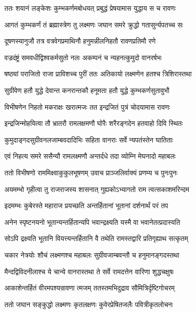 \twolineshloka
{ततः शयानं लङ्केशः कुम्भकर्णमबोधयत्}
{प्रबुद्धं प्रेषयामास युद्धाय स च रावणः}%

\twolineshloka
{आगतं कुम्भकर्णं तं ब्रह्मास्त्रेण तु लक्ष्मणः}
{जघान समरे क्रुद्धो गतासुर्न्यपतच्च सः}%

\twolineshloka
{दूषणस्यानुजौ तत्र वत्रवेगप्रमाथिनौ}
{हनुमन्नीलनिहतौ रावणप्रतिमौ रणे}%

\twolineshloka
{वज्रदंष्ट्रं समवधीद्विश्वकर्मसुतो नलः}
{अकम्पनं च न्यहनत्कुमुदो वानरर्षभः}%

\twolineshloka
{षष्ठ्यां पराजितो राजा प्राविशच्च पुरीं ततः}
{अतिकायो लक्ष्मणेन हतश्च त्रिशिरास्तथा}%

\twolineshloka
{सुग्रीवेण हतौ युद्धे देवान्त कनरान्तकौ}
{हनूमता हतौ युद्धे कुम्भकर्णसुतावुभौ}%

\twolineshloka
{विभीषणेन निहतो मकराक्षः खरात्मजः}
{तत इन्द्रजितं पुत्रं चोदयामास रावणः}%

\twolineshloka
{इन्द्रजिन्मोहयित्वा तौ भ्रातरौ रामलक्षमणौ}
{घोरैः शरैरङ्गदेन हतवाहो दिवि स्थितः}%

\twolineshloka
{कुमुदाङ्गदसुग्रीवनलजाम्बवदादिभिः}
{सहिता वानराः सर्वे न्यपतंस्तेन घातिताः}%

\twolineshloka
{एवं निहत्य समरे ससैन्यौ रामलक्ष्मणौ}
{अन्तर्दधे तदा व्योम्नि मेघनादो महाबलः}%

\twolineshloka
{ततो विभीषणो राममिक्ष्वाकुकुलभूषणम्}
{उवाच प्राञ्जलिर्वाक्यं प्रणम्य च पुनःपुनः}%

\twolineshloka
{अयमम्भो गृहीत्वा तु राजराजस्य शासनात्}
{गुह्यकोऽभ्यागतो राम त्वत्सकाशमरिन्दम}%

\twolineshloka
{इदमम्भः कुबेरस्ते महाराज प्रयच्छति}
{अन्तर्हितानां भूतानां दर्शनार्थं परं तप}%

\twolineshloka
{अनेन स्पृष्टनयनो भूतान्यन्तर्हितान्यपि}
{भवान्द्रक्ष्यति यस्मै वा भवानेतत्प्रदास्यति}%

\twolineshloka
{सोऽपि द्रक्ष्यति भूतानि वियत्त्यन्तर्हितानि वै}
{तथेति रामस्तद्वारि प्रतिगृह्याथ सत्कृतम्}%

\twolineshloka
{चकार नेत्रयोः शौचं लक्ष्मणश्च महाबलः}
{सुग्रीवजाम्बवन्तौ च हनुमानङ्गदस्तथा}%

\twolineshloka
{मैन्दद्विविदनीलाश्च ये चान्ये वानरास्तथा}
{ते सर्वे रामदत्तेन वारिणा शुद्धचक्षुषः}%

\twolineshloka
{आकाशेन्तर्हितं वीरमपश्यन्रावणा त्मजम्}
{ततस्तमभिदुद्राव सौमित्रिर्दृष्टिगोचरम्}%

\twolineshloka
{ततो जघान सङ्कुद्धो लक्ष्मणः कृतलक्षणः}
{कुवेरप्रेषितजलैः पवित्रीकृतलोचनः}%

